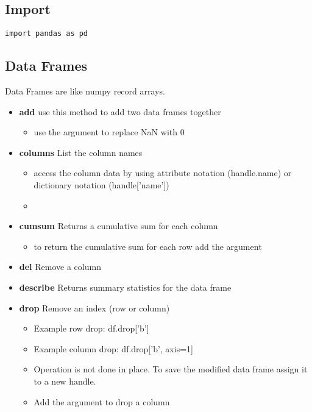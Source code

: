 \subsection{Import}
\begin{lstlisting}
import pandas as pd
\end{lstlisting}

\subsection{Data Frames}
Data Frames are like numpy record arrays.
\begin{itemize}
  \item \textbf{add} use this method to add two data frames together
    \begin{itemize}
      \item use the {\color{red}{fill\_value=0}} argument to replace NaN with 0
    \end{itemize}
  \item \textbf{columns} List the column names
    \begin{itemize}
      \item access the column data by using attribute notation (handle.name) or
        dictionary notation (handle['name'])
      \item \color{red}{If the column name is more than one word you must use
        the dictionary notation}
    \end{itemize}
  \item \textbf{cumsum} Returns a cumulative sum for each column
    \begin{itemize}
      \item to return the cumulative sum for each row add the argument
        \color{red}{axis=1}
    \end{itemize}
  \item \textbf{del} Remove a column
  \item \textbf{describe} Returns summary statistics for the data frame
  \item \textbf{drop} Remove an index (row or column)
    \begin{itemize}
      \item Example row drop: df.drop['b']
      \item Example column drop: df.drop['b', axis=1]
      \item Operation is not done in place.  To save the modified data frame
        assign it to a new handle.
      \item Add the argument \color{red}{axis=1} to drop a column

\end{itemize}
\end{itemize}
